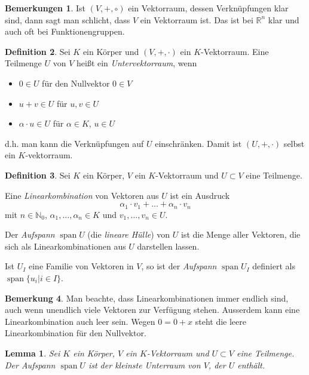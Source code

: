 \documentclass[index=totoc]{scrartcl}%
\newtheorem{lem}[thm]{Lemma}
\theoremstyle{definition}
\newtheorem{defi}{Definition}[section]
\newtheorem{bem}[defi]{Bemerkung}
\newtheorem{bemn}[defi]{Bemerkungen}
\newcommand{\N}{\mathbb N}
\newcommand{\R}{\mathbb R}
\DeclareMathOperator{\spann}{span}
\begin{document}
\begin{bemn}
  Ist $(V, +, \circ)$ ein Vektorraum, dessen Verknüpfungen klar sind,
  dann sagt man schlicht, dass $V$ ein Vektorraum ist.
  Das ist bei $\R^n$ klar und auch oft bei Funktionengruppen. 
\end{bemn}

\begin{defi}
  Sei $K$ ein Körper und $(V,+,\cdot)$ ein $K$-Vektorraum.
  Eine Teilmenge $U$ von $V$ heißt ein {\em Untervektorraum}, wenn
  \begin{itemize}
  \item
    $0\in U$ für den Nullvektor $0\in V$ 
  \item
    $u+v\in U$ für $u,v\in U$ 
  \item
     $\alpha\cdot u\in U$ für $\alpha\in K$, $u\in U$ 
   \end{itemize}
  d.h. man kann die Verknüpfungen auf $U$ einschränken.
  Damit ist $(U,+,\cdot)$ selbst ein $K$-vektorraum.
\end{defi}

\begin{defi}
  Sei $K$ ein Körper, $V$ ein $K$-Vektorraum und $U\subset V$ eine Teilmenge.

  Eine {\em Linearkombination} von Vektoren aus $U$ ist ein Ausdruck
  \begin{equation*}
    \alpha_1\cdot v_1+\ldots+\alpha_n\cdot v_n
  \end{equation*}
  mit $n\in\N_0$, $\alpha_1,\dots,\alpha_n\in K$ und $v_1,\dots,v_n\in U$.

  Der {\em Aufspann} $\spann U$ (die {\em lineare Hülle}) von $U$
    ist die Menge aller Vektoren,
  die sich als Linearkombinationen aus $U$ darstellen lassen. 

  Ist $U_I$ eine Familie von Vektoren in $V$,
  so ist der {\em Aufspann} $\spann U_I$ definiert als $\spann\{u_i|i\in I\}$.
\end{defi}

\begin{bem}
  Man beachte, dass Linearkombinationen immer endlich sind,
  auch wenn unendlich viele Vektoren zur Verfügung stehen.
  Ausserdem kann eine Linearkombination auch leer sein.
  Wegen $0=0+x$ steht die leere Linearkombination für den Nullvektor. 
\end{bem}


\begin{lem}
  Sei $K$ ein Körper, $V$ ein $K$-Vektorraum und $U\subset V$ eine Teilmenge.
  Der Aufspann $\spann U$ ist der kleinste Unterraum von $V$, der $U$ enthält. 
\end{lem}
\end{document}
